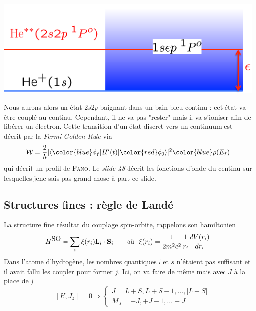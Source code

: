 \begin{center}
\includegraphics[scale=0.5]{ch3/image9}
\end{center}

Nous aurons alors un état $2s2p$ baignant dans un bain bleu continu : cet état va être couplé au 
continu. Cependant, il ne va pas "rester" mais il va s'ioniser afin de libérer un électron. Cette
transition d'un état discret vers un continuum est décrit par la \textit{Fermi Golden Rule} via
\begin{equation}
{\cal{W}}=\frac{2}{\hbar} 
|\langle {\color{blue} \phi_ f} |H'(t)|
{\color{red} \phi_0 } \rangle|^2  {\color{blue} \rho(E_f) }
\end{equation}
qui décrit un profil de \textsc{Fano}. Le \textit{slide 48} décrit les fonctions d'onde du continu
sur lesquelles jene sais pas grand chose à part ce slide.
 
 
\subsection{Structures fines : règle de Landé} 
La structure fine résultat du couplage spin-orbite, rappelons son hamiltonien
\begin{equation}
H^{\mbox{SO}} = \sum_i \xi(r_i) {\bf L}_i \cdot {\bf S}_i\qquad\text{où }\ 
\xi(r_i) = \frac{1}{2 m^2 c^2} \frac{1}{r_i} \frac{dV(r_i)}{dr_i}
\end{equation}
Dans l'atome d'hydrogène, les nombres quantiques $l$ et $s$ n'étaient pas suffisant et il avait 
fallu les coupler pour former $j$. Ici, on va faire de même mais avec $J$ à la place de $j$
\begin{equation}
[H, {\bf J}^2] = [H,J_z] = 0 \Rightarrow 
\left\{
\begin{array}{l}
J = L+S, L+S-1, \ldots, \vert L-S \vert \\
M_J= +J, +J-1, \ldots -J \end{array} \right.
\end{equation}
 

